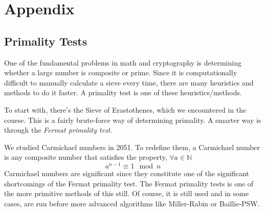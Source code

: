 \documentclass[conference]{IEEEtran}
\begin{document}
\section{Appendix}
\subsection{Primality Tests}
One of the fundamental problems in math and cryptography is determining whether a large number is composite or prime. Since it is computationally difficult to manually calculate a sieve every time, there are many heuristics and methods to do it faster. A primality test is one of these heuristics/methods.

To start with, there's the Sieve of Erastothenes, which we encountered in the course. This is a fairly brute-force way of determining primality. A smarter way is through the \textit{Fermat primality test}.

We studied Carmichael numbers in 2051. To redefine them, a Carmichael number is any composite number that satisfies the property, $\forall a \in \mathbb{N}$
\[
    a^{n -1} \equiv 1 \mod n 
\]
Carmichael numbers are significant since they constitute one of the significant shortcomings of the Fermat primality test. The Fermat primality tests is one of the more primitive methods of this still. Of course, it is still used and in some cases, are run before more advanced algorithms like Miller-Rabin or Baillie-PSW.
\end{document}

